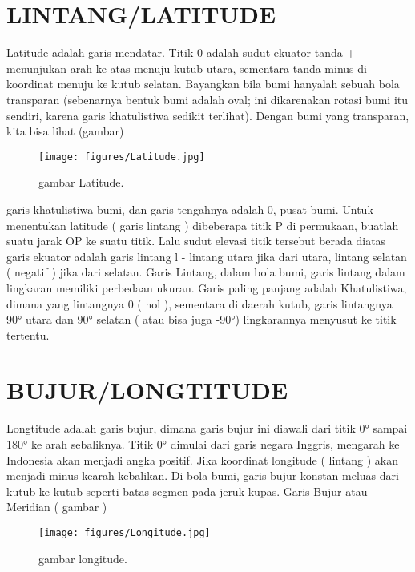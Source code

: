 \section{LINTANG/LATITUDE}

	Latitude adalah garis mendatar. Titik 0 adalah sudut ekuator tanda + menunjukan arah ke atas menuju kutub utara,
	sementara tanda minus di koordinat menuju ke kutub selatan. Bayangkan bila bumi hanyalah sebuah bola transparan 
	(sebenarnya bentuk bumi adalah oval; ini dikarenakan rotasi bumi itu sendiri, karena garis khatulistiwa sedikit 
	terlihat). Dengan bumi yang transparan, kita bisa lihat (gambar)
	\begin{figure}[ht]
	\centerline{\texttt{[image: figures/Latitude.jpg]}}
	\caption{gambar Latitude.}
	\label{Gambar Latitude}
	\end{figure}
	garis khatulistiwa bumi, dan garis tengahnya adalah
	0, pusat bumi. Untuk menentukan latitude ( garis lintang ) dibeberapa titik P di permukaan, buatlah suatu jarak OP 
	ke suatu titik. Lalu sudut elevasi titik tersebut berada diatas garis ekuator adalah garis lintang l - lintang utara
	jika dari utara, lintang selatan ( negatif ) jika dari selatan. 
	Garis Lintang, dalam bola bumi, garis lintang dalam lingkaran memiliki perbedaan ukuran. Garis paling panjang adalah 
	Khatulistiwa, dimana yang lintangnya 0 ( nol ), sementara di daerah kutub, garis lintangnya 90° utara dan 90° selatan
	( atau bisa juga -90°) lingkarannya menyusut ke titik tertentu.

\section{BUJUR/LONGTITUDE}

	Longtitude adalah garis bujur, dimana garis bujur ini diawali dari titik 0° sampai 180° ke arah sebaliknya. Titik 0° dimulai dari
	garis negara Inggris, mengarah ke Indonesia akan menjadi angka positif. Jika koordinat longitude ( lintang ) akan menjadi minus 
	kearah kebalikan. Di bola bumi, garis bujur konstan meluas dari kutub ke kutub seperti batas segmen pada jeruk kupas. Garis Bujur atau
	Meridian ( gambar )
	\begin{figure}[ht]
	\centerline{\texttt{[image: figures/Longitude.jpg]}}
	\caption{gambar longitude.}
	\label{Gambar Longitude}
	\end{figure}
	
